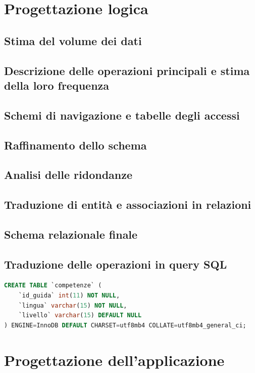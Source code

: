 \documentclass[a4paper,12pt]{report}
\begin{document}
\newpage
\chapter{Progettazione logica}
\section{Stima del volume dei dati}
\section{Descrizione delle operazioni principali e stima della loro frequenza}
\section{Schemi di navigazione e tabelle degli accessi}
\section{Raffinamento dello schema}
\section{Analisi delle ridondanze}
\section{Traduzione di entità e associazioni in relazioni}


\section{Schema relazionale finale}
\newpage
\section{Traduzione delle operazioni in query SQL}
\begin{lstlisting}[style=codeStyle,language=SQL]
	CREATE TABLE `competenze` (
  	`id_guida` int(11) NOT NULL,
  	`lingua` varchar(15) NOT NULL,
  	`livello` varchar(15) DEFAULT NULL
) ENGINE=InnoDB DEFAULT CHARSET=utf8mb4 COLLATE=utf8mb4_general_ci;
\end{lstlisting}
\newpage
\chapter{Progettazione dell'applicazione}
\end{document}
